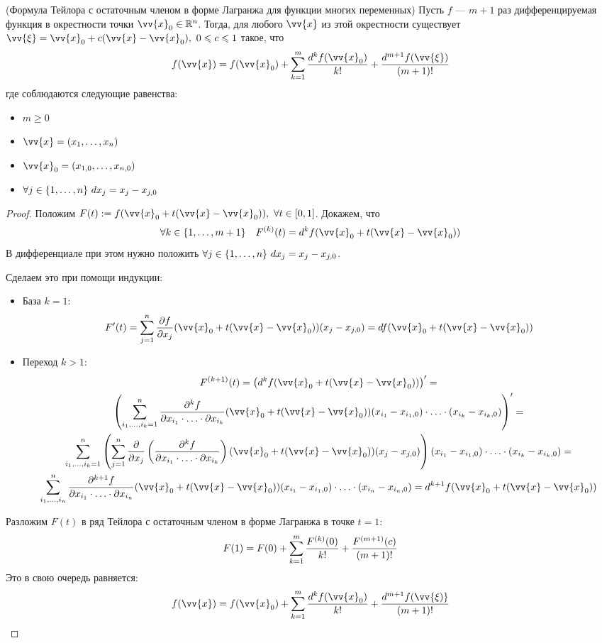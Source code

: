 \begin{theorem} (Формула Тейлора с остаточным членом в форме Лагранжа для функции многих переменных)
	Пусть $f$ --- $m + 1$ раз дифференцируемая функция в окрестности точки $\vv{x}_0 \in \R^n$. Тогда, для любого $\vv{x}$ из этой окрестности существует $\vv{\xi} = \vv{x}_0 + c(\vv{x} - \vv{x}_0),\ 0 \le c \le 1$ такое, что
	\[
		f(\vv{x}) = f(\vv{x}_0) + \suml_{k = 1}^m \frac{d^k f(\vv{x}_0)}{k!} + \frac{d^{m + 1} f(\vv{\xi})}{(m + 1)!}
	\]
	где соблюдаются следующие равенства:
	\begin{itemize}
		\item \(m \ge 0\)
		\item \(\vv{x} = (x_1, \ldots, x_n)\)
		\item \(\vv{x}_0 = (x_{1, 0}, \ldots, x_{n, 0})\)
		\item \(\forall j \in \{1, \ldots, n\}\ dx_j = x_j - x_{j, 0}\)
	\end{itemize}
\end{theorem}

\begin{proof}
	Положим $F(t) := f(\vv{x}_0 + t(\vv{x} - \vv{x}_0)),\  \forall t \in [0, 1]$. Докажем, что
	\[
		\forall k \in \range{m + 1} \quad F^{(k)} (t) = d^k f(\vv{x}_0 + t(\vv{x} - \vv{x}_0))
	\]
	В дифференциале при этом нужно положить $\forall j \in \{1, \ldots, n\} \ dx_j = x_j - x_{j, 0}$.
	
	Сделаем это при помощи индукции:
	\begin{itemize}
		\item База $k = 1$:
		\[
			F'(t) = \suml_{j = 1}^n \pd{f}{x_j} (\vv{x}_0 + t(\vv{x} - \vv{x}_0)) (x_j - x_{j, 0}) = df (\vv{x}_0 + t(\vv{x} - \vv{x}_0))
		\]
		\item Переход $k > 1$:
		\begin{multline*}
			F^{(k + 1)}(t) = \left(d^k f(\vv{x}_0 + t(\vv{x} - \vv{x}_0))\right)' =
			\\
			\left(\suml_{i_1, \ldots, i_k  = 1}^n \frac{\vdelta^k f}{\vdelta x_{i_1} \cdot \ldots \cdot \vdelta x_{i_k}} (\vv{x}_0 + t(\vv{x} - \vv{x}_0)) (x_{i_1} - x_{i_1, 0}) \cdot \ldots \cdot (x_{i_k} - x_{i_k, 0})\right)' =
			\\
			\suml_{i_1, \ldots, i_k = 1}^n \left(\suml_{j = 1}^n \pd{}{x_j} \left(\frac{\vdelta^k f}{\vdelta x_{i_1} \cdot \ldots \cdot \vdelta{x_{i_k}}}\right) (\vv{x}_0 + t(\vv{x} - \vv{x}_0))(x_j - x_{j, 0})\right) (x_{i_1} - x_{i_1, 0}) \cdot \ldots \cdot (x_{i_k} - x_{i_k, 0}) = 
			\\
			\suml_{i_1, \ldots, i_n}^n\frac{\vdelta^{k + 1} f}{\vdelta x_{i_1}\cdot\ldots\cdot \vdelta x_{i_n}}(\vv{x}_0 + t(\vv{x} - \vv{x}_0))(x_{i_1} - x_{i_1, 0})\cdot\ldots\cdot(x_{i_n} - x_{i_n, 0}) = d^{k + 1}f(\vv{x}_0 + t(\vv{x} - \vv{x}_0))
		\end{multline*}
	\end{itemize}
	Разложим $F(t)$ в ряд Тейлора с остаточным членом в форме Лагранжа в точке $t = 1$:
	\[
		F(1) = F(0) + \sum\limits_{k = 1}^m\frac{F^{(k)}(0)}{k!} + \frac{F^{(m + 1)}(c)}{(m + 1)!}
	\]
	Это в свою очередь равняется:
	\[
		f(\vv{x}) = f(\vv{x}_0) + \suml_{k = 1}^m\frac{d^{k}f(\vv{x}_0)}{k!} + \frac{d^{m + 1}f(\vv{\xi)}}{(m + 1)!}
	\]
\end{proof}


